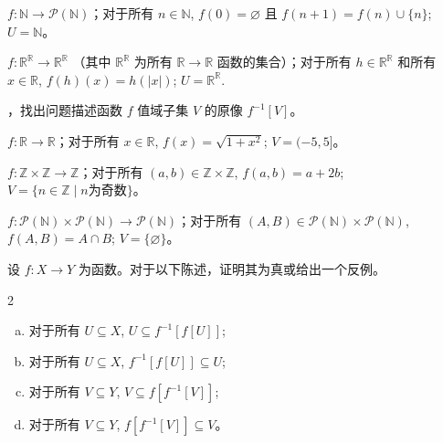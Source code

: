 \begin{chapex}
$f : \mathbb{N} \to \mathcal{P}(\mathbb{N})$；对于所有 $n \in \mathbb{N}$, $f(0) = \varnothing$ 且 $f(n+1) = f(n) \cup \{ n \}$; $U = \mathbb{N}$。
\end{chapex}

\begin{chapex}
$f : \mathbb{R}^{\mathbb{R}} \to \mathbb{R}^{\mathbb{R}}$ （其中 $\mathbb{R}^{\mathbb{R}}$ 为所有 $\mathbb{R} \to \mathbb{R}$ 函数的集合）；对于所有 $h \in \mathbb{R}^{\mathbb{R}}$ 和所有 $x \in \mathbb{R}$, $f(h)(x) = h(|x|)$; $U = \mathbb{R}^{\mathbb{R}}$.
\end{chapex}

，找出问题描述函数 $f$ 值域子集 $V$ 的原像 $f^{-1}[V]$。

\begin{chapex}
\label{cqComputePreimageBegin}
$f : \mathbb{R} \to \mathbb{R}$；对于所有 $x \in \mathbb{R}$, $f(x) = \sqrt{1+x^2}$; $V = (-5,5]$。
\end{chapex}

\begin{chapex}
$f : \mathbb{Z} \times \mathbb{Z} \to \mathbb{Z}$；对于所有 $(a,b) \in \mathbb{Z} \times \mathbb{Z}$, $f(a,b) = a+2b$; $V = \{ n \in \mathbb{Z} \mid n \text{为奇数} \}$。
\end{chapex}

\begin{chapex}
\label{cqComputePreimageEnd}
$f : \mathcal{P}(\mathbb{N}) \times \mathcal{P}(\mathbb{N}) \to \mathcal{P}(\mathbb{N})$；对于所有 $(A,B) \in \mathcal{P}(\mathbb{N}) \times \mathcal{P}(\mathbb{N})$, $f(A,B) = A \cap B$; $V = \{ \varnothing \}$。
\end{chapex}

\begin{chapex}
设 $f : X \to Y$ 为函数。对于以下陈述，证明其为真或给出一个反例。
\begin{multicols}{2}
\begin{enumerate}[(a)]
\item 对于所有 $U \subseteq X$, $U \subseteq f^{-1}[f[U]]$;
\item 对于所有 $U \subseteq X$, $f^{-1}[f[U]] \subseteq U$;
\item 对于所有 $V \subseteq Y$, $V \subseteq f[f^{-1}[V]]$;
\item 对于所有 $V \subseteq Y$, $f[f^{-1}[V]] \subseteq V$。
\end{enumerate}
\end{multicols}
\end{chapex}


